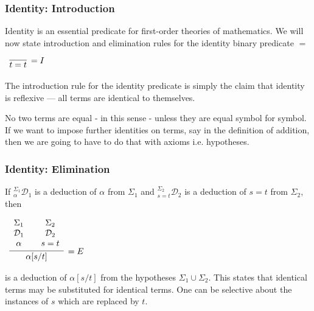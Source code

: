 \documentclass{beamer}
\theoremstyle{indentDefn} \newtheorem{defn}[]{Definition}
\begin{document}
\begin{frame}
	\frametitle{Identity: Introduction}

	Identity is an essential predicate for first-order theories of mathematics. We will now state introduction and elimination rules for the identity binary predicate $=$ 

	\vspace{2mm}

	\begin{center}
		$\begin{array}{c}
			\infer[= I]{t = t}
				{}
		\end{array}$
	\end{center}

	\vspace{2mm}

	The introduction rule for the identity predicate is simply the claim that identity is reflexive --- all terms are identical to themselves. 

	\vspace{2mm}

	No two terms are equal - in this sense - unless they are equal symbol for symbol. If we want to impose further identities on terms, say in the definition of addition, then we are going to have to do that with axioms i.e. hypotheses. 
\end{frame}

\begin{frame}
	\frametitle{Identity: Elimination}

	If $^{\Sigma_{1}}_{\alpha}\mathcal{D}_{1}$ is a deduction of $\alpha$ from $\Sigma_{1}$ and $^{\Sigma_{2}}_{s=t}\mathcal{D}_{2}$ is a deduction of $s = t$ from $\Sigma_{2}$, then

	\begin{center}
		$\begin{array}{c}
			\infer[= E]{\alpha[s/t]}
				{\begin{array}{c} \Sigma_{1} \\ \mathcal{D}_{1} \\ \alpha \end{array}
				&
				\begin{array}{c} \Sigma_{2} \\ \mathcal{D}_{2} \\ s = t \end{array}}			
		\end{array}$
	\end{center}

	is a deduction of $\alpha[s/t]$ from the hypotheses $\Sigma_{1} \cup \Sigma_{2}$. This states that identical terms may be substituted for identical terms. One can be selective about the instances of $s$ which are replaced by $t$. 

	\vspace{30mm}

\end{frame}
\end{document}
